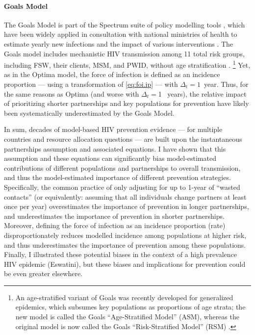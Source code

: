 \paragraph{Goals Model}\cite{Stover2014,Stover2021}
The Goals Model is part of the Spectrum suite of policy modelling tools \cite{Spectrum2022},
which have been widely applied in consultation with national ministries of health
to estimate yearly new infections and the impact of various interventions \cite{Stover2021}.
The Goals model includes mechanistic HIV transmission among 11 total risk groups, including
FSW, their clients, MSM, and PWID, without age stratification \cite{Stover2014}.%
\footnote{An age-stratified variant of Goals was recently developed for generalized epidemics,
  which subsumes key populations as proportions of age strata;
  the new model is called the Goals ``Age-Stratified Model'' (ASM), whereas
  the original model is now called the Goals ``Risk-Stratified Model'' (RSM) \cite{Stover2021}.}
Yet, as in the Optima model, the force of infection is defined as an incidence proportion
--- using a transformation of \eqref{eq:foi.ip} --- with $\Delta_t = 1$~year.
Thus, for the same reasons as Optima (and worse with $\Delta_t = {}$1 ~years),
the relative impact of prioritizing shorter partnerships and key populations for prevention
have likely been systematically underestimated by the Goals Model.
\par
In sum, decades of model-based HIV prevention evidence
--- for multiple countries and resource allocation questions ---
are built upon the instantaneous partnerships assumption and associated equations.
I have shown that this assumption and these equations can significantly bias
model-estimated contributions of different populations and partnerships to overall transmission,
and thus the model-estimated importance of different prevention strategies.
Specifically, the common practice of only adjusting for up to 1-year of ``wasted contacts''
(or equivalently: assuming that all individuals change partners at least once per year)
overestimates the importance of prevention in longer partnerships, and
underestimates the importance of prevention in shorter partnerships.
Moreover, defining the force of infection as an incidence proportion (\vs rate)
disproportionately reduces modelled incidence among populations at higher risk,
and thus underestimates the importance of prevention among these populations.
Finally, I illustrated these potential biases
in the context of a high prevalence HIV epidemic (Eswatini),
but these biases and implications for prevention could be even greater elsewhere.
